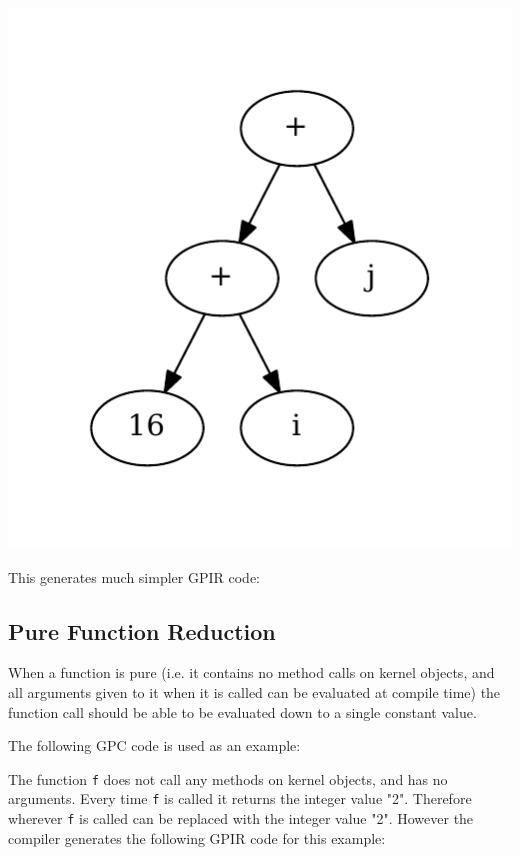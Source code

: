 \begin{center}
\includegraphics[scale=0.5]{graphs/optimalFullyEvalTree.pdf}
\end{center}

This generates much simpler GPIR code:
 


\subsection{Pure Function Reduction}

When a function is pure (i.e. it contains no method calls
on kernel objects, and all arguments given to it when it is called can be evaluated at 
compile time) the function call should be able to be evaluated down to a single constant value.

The following GPC code is used as an example:



The function \texttt{f} does not call any methods on kernel objects, and has no arguments.
Every time \texttt{f} is called it returns the integer value "2". Therefore wherever \texttt{f} 
is called can be replaced with the integer value "2". 
However the compiler generates the following GPIR code for this example:

